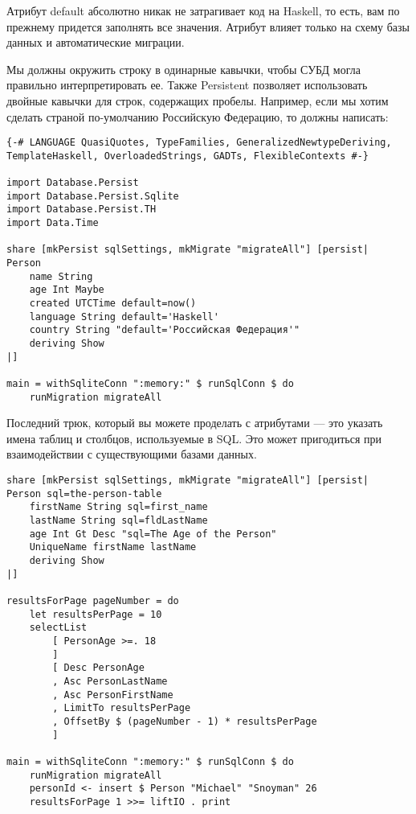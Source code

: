 \begin{remark}
Атрибут default абсолютно никак не затрагивает код на Haskell, то есть, вам по прежнему придется заполнять все значения. Атрибут влияет только на схему базы данных и автоматические миграции.
\end{remark}

Мы должны окружить строку в одинарные кавычки, чтобы СУБД могла правильно интерпретировать ее. Также Persistent позволяет использовать двойные кавычки для строк, содержащих пробелы. Например, если мы хотим сделать страной по-умолчанию Российскую Федерацию, то должны написать:

\begin{lstlisting}
{-# LANGUAGE QuasiQuotes, TypeFamilies, GeneralizedNewtypeDeriving, TemplateHaskell, OverloadedStrings, GADTs, FlexibleContexts #-}

import Database.Persist
import Database.Persist.Sqlite
import Database.Persist.TH
import Data.Time

share [mkPersist sqlSettings, mkMigrate "migrateAll"] [persist|
Person
    name String
    age Int Maybe
    created UTCTime default=now()
    language String default='Haskell'
    country String "default='Российская Федерация'"
    deriving Show
|]

main = withSqliteConn ":memory:" $ runSqlConn $ do
    runMigration migrateAll
\end{lstlisting}%

Последний трюк, который вы можете проделать с атрибутами --- это указать имена таблиц и столбцов, используемые в SQL. Это может пригодиться при взаимодействии с существующими базами данных.

\begin{lstlisting}
share [mkPersist sqlSettings, mkMigrate "migrateAll"] [persist|
Person sql=the-person-table
    firstName String sql=first_name
    lastName String sql=fldLastName
    age Int Gt Desc "sql=The Age of the Person"
    UniqueName firstName lastName
    deriving Show
|]

resultsForPage pageNumber = do
    let resultsPerPage = 10
    selectList
        [ PersonAge >=. 18
        ]
        [ Desc PersonAge
        , Asc PersonLastName
        , Asc PersonFirstName
        , LimitTo resultsPerPage
        , OffsetBy $ (pageNumber - 1) * resultsPerPage
        ]

main = withSqliteConn ":memory:" $ runSqlConn $ do
    runMigration migrateAll
    personId <- insert $ Person "Michael" "Snoyman" 26
    resultsForPage 1 >>= liftIO . print
\end{lstlisting}%

